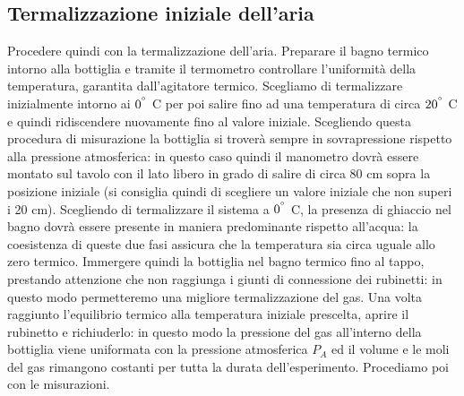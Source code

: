 \subsection{Termalizzazione iniziale dell'aria}
Procedere quindi con la termalizzazione dell'aria.
Preparare il bagno termico intorno alla bottiglia e tramite il termometro controllare l'uniformità della temperatura, garantita dall'agitatore termico.
Scegliamo di termalizzare inizialmente intorno ai $0^{\degree}$ C per poi salire fino ad una temperatura di circa $20^{\degree}$ C e quindi ridiscendere nuovamente fino al valore iniziale.
Scegliendo questa procedura di misurazione la bottiglia si troverà sempre in sovrapressione rispetto alla pressione atmosferica: in questo caso quindi il manometro dovrà essere montato sul tavolo con il lato libero in grado di salire di circa 80 cm sopra la posizione iniziale (si consiglia quindi di scegliere un valore iniziale che non superi i 20 cm).
Scegliendo di termalizzare il sistema a $0^{\degree}$ C, la presenza di ghiaccio nel bagno dovrà essere presente in maniera predominante rispetto all'acqua: la coesistenza di queste due fasi assicura che la temperatura sia circa uguale allo zero termico.
Immergere quindi la bottiglia nel bagno termico fino al tappo, prestando attenzione che non raggiunga i giunti di connessione dei rubinetti: in questo modo permetteremo una migliore termalizzazione del gas.
Una volta raggiunto l'equilibrio termico alla temperatura iniziale prescelta, aprire il rubinetto e richiuderlo: in questo modo la pressione del gas all'interno della bottiglia viene uniformata con la pressione atmosferica $P_{A}$ ed il volume e le moli del gas rimangono costanti per tutta la durata dell'esperimento.
Procediamo poi con le misurazioni.\\

